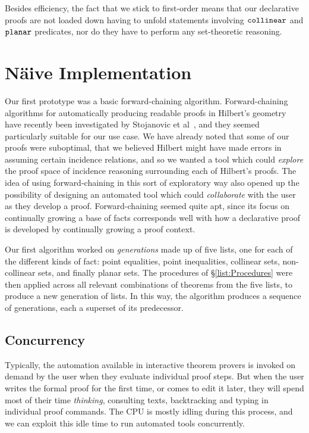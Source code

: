 Besides efficiency, the fact that we stick to first-order means that our declarative proofs are not loaded down having to unfold statements involving $\texttt{collinear}$ and $\texttt{planar}$ predicates, nor do they have to perform any set-theoretic reasoning.

\section{N\"{a}ive Implementation}\label{sec:NaiveImplementation}
Our first prototype was a basic forward-chaining algorithm. Forward-chaining algorithms for automatically producing readable proofs in Hilbert's geometry have recently been investigated by Stojanovic et al~\cite{ForwardChainHilbert}, and they seemed particularly suitable for our use case. We have already noted that some of our proofs were suboptimal, that we believed Hilbert might have made errors in assuming certain incidence relations, and so we wanted a tool which could \emph{explore} the proof space of incidence reasoning surrounding each of Hilbert's proofs. The idea of using forward-chaining in this sort of exploratory way also opened up the possibility of designing an automated tool which could \emph{collaborate} with the user as they develop a proof. Forward-chaining seemed quite apt, since its focus on continually growing a base of facts corresponds well with how a declarative proof is developed by continually growing a proof context. 

Our first algorithm worked on \emph{generations} made up of five lists, one for each of the different kinds of fact: point equalities, point inequalities, collinear sets, non-collinear sets, and finally planar sets. The procedures of \S\ref{list:Procedures} were then applied across all relevant combinations of theorems from the five lists, to produce a new generation of lists. In this way, the algorithm produces a sequence of generations, each a superset of its predecessor.

\subsection{Concurrency}\label{sec:NaiveConcurrency}
Typically, the automation available in interactive theorem provers is invoked on demand by the user when they evaluate individual proof steps. But when the user writes the formal proof for the first time, or comes to edit it later, they will spend most of their time \emph{thinking}, consulting texts, backtracking and typing in individual proof commands. The CPU is mostly idling during this process, and we can exploit this idle time to run automated tools concurrently.


